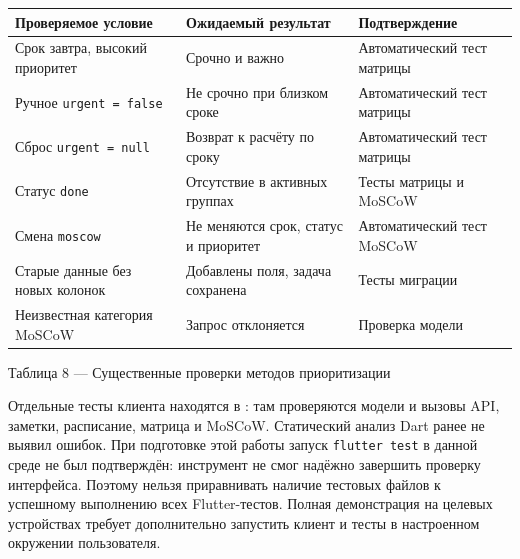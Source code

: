 \documentclass[14pt,a4paper]{extarticle}
\begin{document}
\begingroup\small
\begin{longtable}[]{@{}
  >{\raggedright\arraybackslash}p{}
  >{\raggedright\arraybackslash}p{}
  >{\raggedright\arraybackslash}p{}@{}}
\toprule\noalign{}
\begin{minipage}[b]{\linewidth}\raggedright
\textbf{Проверяемое условие}
\end{minipage} & \begin{minipage}[b]{\linewidth}\raggedright
\textbf{Ожидаемый результат}
\end{minipage} & \begin{minipage}[b]{\linewidth}\raggedright
\textbf{Подтверждение}
\end{minipage} \\
\midrule\noalign{}
\endhead
\bottomrule\noalign{}
\endlastfoot
Срок завтра, высокий приоритет & Срочно и важно & Автоматический тест матрицы \\
Ручное \texttt{urgent\ =\ false} & Не срочно при близком сроке & Автоматический тест матрицы \\
Сброс \texttt{urgent\ =\ null} & Возврат к расчёту по сроку & Автоматический тест матрицы \\
Статус \texttt{done} & Отсутствие в активных группах & Тесты матрицы и MoSCoW \\
Смена \texttt{moscow} & Не меняются срок, статус и приоритет & Автоматический тест MoSCoW \\
Старые данные без новых колонок & Добавлены поля, задача сохранена & Тесты миграции \\
Неизвестная категория MoSCoW & Запрос отклоняется & Проверка модели \\
\end{longtable}
\endgroup

Таблица 8 --- Существенные проверки методов приоритизации

Отдельные тесты клиента находятся в : там проверяются модели и вызовы API, заметки, расписание, матрица и MoSCoW. Статический анализ Dart ранее не выявил ошибок. При подготовке этой работы запуск \texttt{flutter\ test} в данной среде не был подтверждён: инструмент не смог надёжно завершить проверку интерфейса. Поэтому нельзя приравнивать наличие тестовых файлов к успешному выполнению всех Flutter-тестов. Полная демонстрация на целевых устройствах требует дополнительно запустить клиент и тесты в настроенном окружении пользователя.
\end{document}
